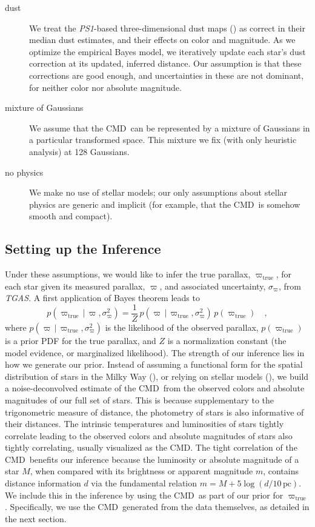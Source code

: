 \documentclass[modern]{aastex61}
\newcommand{\acronym}[1]{{\small{#1}}}
\newcommand{\project}[1]{\textsl{#1}}
\newcommand{\tgas}{\project{\acronym{TGAS}}}
\newcommand{\psone}{\project{\acronym{PS1}}}
\newcommand{\cmd}{\acronym{CMD}}
\newcommand{\given}{\,|\,}
\newcommand{\true}{\mathrm{true}}
\begin{document}
\begin{description}
\item[dust] We treat the \psone-based three-dimensional dust maps (\citealt{green15})
  as correct in their median dust estimates, and their
  effects on color and magnitude. As we optimize the empirical Bayes model, we iteratively update each star's
  dust correction at its updated, inferred distance. Our assumption is that these corrections are
  good enough, and uncertainties in these are not dominant, for neither
  color nor absolute magnitude.
\item[mixture of Gaussians] We assume that the \cmd\ can be represented by a mixture of
  Gaussians in a particular transformed space. This mixture we fix
  (with only heuristic analysis) at 128 Gaussians.
\item[no physics] We make no use of stellar models; our only assumptions about
  stellar physics are generic and implicit (for example, that the
  \cmd\ is somehow smooth and compact).
\end{description}

\subsection{Setting up the Inference}

Under these assumptions, we would like to infer the true parallax, $\varpi_{\true}$, for each star given its measured parallax, $\varpi$, and associated uncertainty, $\sigma_{\varpi}$, from \tgas.
A first application of Bayes theorem leads to
\begin{equation}
p(\varpi_{\true} \given \varpi, \sigma^2_{\varpi}) = \frac{1}{Z}\,p(\varpi \given \varpi_{\true}, \sigma^2_{\varpi}) \, p(\varpi_{\true}) \quad ,
\label{eq:bayes}
\end{equation}
where $p(\varpi \given \varpi_{\true}, \sigma^2_{\varpi})$ is the likelihood of the observed parallax, $p(\varpi_{\true})$ is a prior PDF for the true
parallax, and $Z$ is a normalization constant (the model evidence, or marginalized likelihood).
The strength of our inference lies in how we generate our prior.
Instead of assuming a functional form for the spatial distribution of stars in the Milky Way (\citealt{astraatmadja16b}), or relying on stellar models (\citealt{gaia16}), we build a noise-deconvolved estimate of the \cmd\ from the observed colors and absolute magnitudes of our full set of stars.
This is because supplementary to the trigonometric measure of distance, the photometry of stars is also informative of their distances.
The intrinsic temperatures and luminosities of stars tightly correlate leading to the observed colors and absolute magnitudes of stars also tightly correlating, usually visualized as the \cmd.
The tight correlation of the \cmd\ benefits our inference because the luminosity or absolute magnitude of a star $M$, when compared with its brightness or apparent magnitude $m$, contains distance information $d$ via the fundamental relation $m=M+5\log(d/10\, \mathrm{pc})$.
We include this in the inference by using the \cmd\ as part of our prior for $\varpi_{\true}$.
Specifically, we use the \cmd\ generated from the data themselves, as detailed in the next section.
\end{document}
